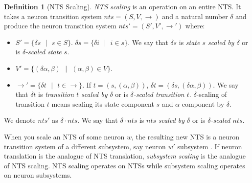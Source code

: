 \documentclass[]{elsarticle}
\theoremstyle{definition}
\newtheorem{definition2}{Definition}
\theoremstyle{definition}
\newcommand{\ra}{\rightarrow}
\newcommand{\se}{\text{ }}
\begin{document}

\begin{definition2}[NTS Scaling]
\emph{NTS scaling} is an operation on an entire NTS. It takes a neuron transition system $nts=
(S,V,\ra)$ and a natural number $\delta$ and produce the neuron transition system $nts'=(S',V',\ra')$
where:
\begin{itemize}
   \item $S'=\{\delta s\se|\se s \in S\}$. $\delta s = \{\delta i\se|\se i\in s\}$.
         We say that $\delta s$ is \emph{state $s$ scaled by $\delta$} or is \emph{$\delta$-scaled 
         state $s$}.
   \item $V'=\{(\delta \alpha,\beta)\se|\se (\alpha,\beta)\in V\}$.
   \item $\ra'=\{\delta t \se|\se t\in \ra \}$. If $t=(s, (\alpha,\beta))$, $\delta t=(\delta s,
         (\delta \alpha,\beta))$. We say that $\delta t$ is \emph{transition $t$ scaled by 
         $\delta$} or is \emph{$\delta$-scaled transition $t$}. $\delta$-scaling of transition $t$ 
         means scaling its state component $s$ and $\alpha$ component by $\delta$.
\end{itemize}
We denote $nts'$ as $\delta\cdot nts$. We say that $\delta\cdot nts$ is $nts$ \emph{scaled by 
$\delta$} or is \emph{$\delta$-scaled $nts$}.
\end{definition2}


When you scale an NTS of some neuron $w$, the resulting new NTS is a neuron transition system 
of a different subsystem, say neuron $w'$ subsystem . If neuron translation is the analogue of NTS 
translation, \emph{subsystem scaling} is the analogue of NTS scaling. NTS scaling operates on NTSs 
while subsystem scaling operates on neuron subsystems.

\end{document}
